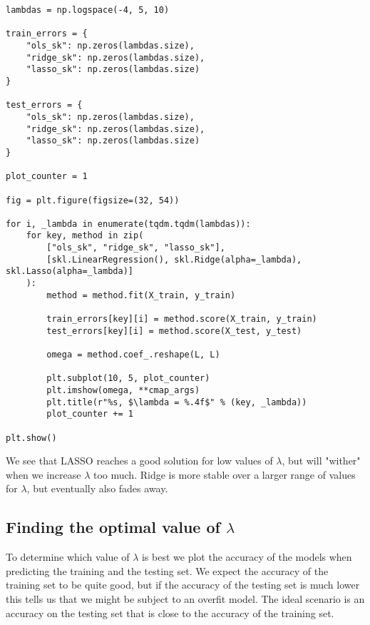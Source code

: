 \documentclass[%
oneside,                 %
final,                   %
10pt]{article}
\begin{document}
\begin{verbatim}
lambdas = np.logspace(-4, 5, 10)

train_errors = {
    "ols_sk": np.zeros(lambdas.size),
    "ridge_sk": np.zeros(lambdas.size),
    "lasso_sk": np.zeros(lambdas.size)
}

test_errors = {
    "ols_sk": np.zeros(lambdas.size),
    "ridge_sk": np.zeros(lambdas.size),
    "lasso_sk": np.zeros(lambdas.size)
}

plot_counter = 1

fig = plt.figure(figsize=(32, 54))

for i, _lambda in enumerate(tqdm.tqdm(lambdas)):
    for key, method in zip(
        ["ols_sk", "ridge_sk", "lasso_sk"],
        [skl.LinearRegression(), skl.Ridge(alpha=_lambda), skl.Lasso(alpha=_lambda)]
    ):
        method = method.fit(X_train, y_train)

        train_errors[key][i] = method.score(X_train, y_train)
        test_errors[key][i] = method.score(X_test, y_test)

        omega = method.coef_.reshape(L, L)

        plt.subplot(10, 5, plot_counter)
        plt.imshow(omega, **cmap_args)
        plt.title(r"%s, $\lambda = %.4f$" % (key, _lambda))
        plot_counter += 1

plt.show()
\end{verbatim}

We see that LASSO reaches a good solution for low
values of $\lambda$, but will "wither" when we increase $\lambda$ too
much. Ridge is more stable over a larger range of values for
$\lambda$, but eventually also fades away.

\subsection*{Finding the optimal value of $\lambda$}

To determine which value of $\lambda$ is best we plot the accuracy of
the models when predicting the training and the testing set. We expect
the accuracy of the training set to be quite good, but if the accuracy
of the testing set is much lower this tells us that we might be
subject to an overfit model. The ideal scenario is an accuracy on the
testing set that is close to the accuracy of the training set.
\end{document}
